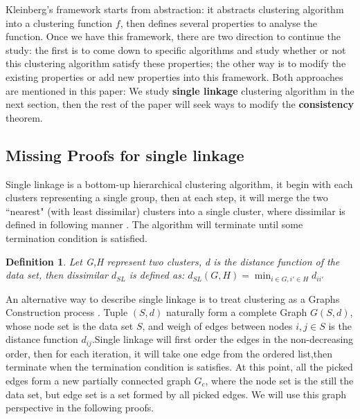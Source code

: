 \documentclass{uonmathreport}
\newtheorem{definition}{Definition}[section]
\begin{document}
Kleinberg's framework starts from abstraction: it abstracts clustering algorithm into a clustering function $f$, then defines several properties to analyse the function. Once we have this framework, there are two direction to continue the study: the first is to come down to specific algorithms and study whether or not this clustering algorithm satisfy these properties; the other way is to modify the existing properties or add new properties into this framework. Both approaches are mentioned in this paper: We study \textbf{single linkage} clustering algorithm in the next section, then the rest of the paper will seek ways to modify the \textbf{consistency} theorem.
\subsection{Missing Proofs for single linkage} \label{subsec:Single-linkage}

Single linkage is a bottom-up hierarchical clustering algorithm, it begin with each clusters representing a single group, then at each step, it will merge the two ``nearest" (with least dissimilar) clusters into a single cluster, where dissimilar is defined in following manner \cite{esl}. The algorithm will terminate until some termination condition is satisfied.
\begin{definition}
Let G,H represent two clusters, d is the distance function of the data set, then dissimilar $d_{SL}$ is defined as:
$d_{SL}(G,H) = \min_{i\in G,i'\in H}d_{ii'} $
\end{definition}

An alternative way to describe single linkage is to treat clustering as a Graphs Construction process \cite{christopher2008introduction}. Tuple $(S,d)$ naturally form a complete Graph $G(S,d)$, whose node set is  the data set $S$, and weigh of edges between nodes $i,j \in S$ is the distance function $d_{ij}$.Single linkage will first order the edges in the non-decreasing order, then for each iteration, it will take one edge from the ordered list,then terminate when the termination condition is satisfies. At this point, all the picked edges form a new partially connected graph $G_{c}$, where the node set is the still the data set, but edge set is a set formed by all picked edges. We will use this graph perspective in the following proofs.
\end{document}
